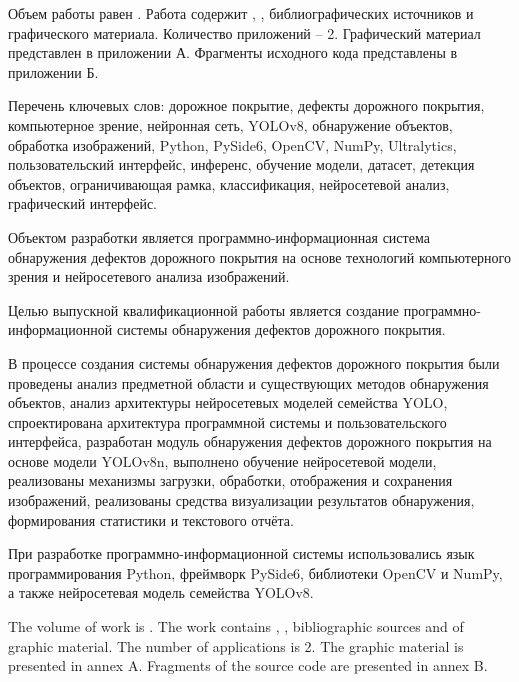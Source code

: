 
Объем работы равен . Работа содержит , ,  библиографических источников и  графического материала. Количество приложений – 2. Графический материал представлен в приложении А. Фрагменты исходного кода представлены в приложении Б.

Перечень ключевых слов: дорожное покрытие, дефекты дорожного покрытия, компьютерное зрение, нейронная сеть, YOLOv8, обнаружение объектов, обработка изображений, Python, PySide6, OpenCV, NumPy, Ultralytics, пользовательский интерфейс, инференс, обучение модели, датасет, детекция объектов, ограничивающая рамка, классификация, нейросетевой анализ, графический интерфейс.

Объектом разработки является программно-информационная система обнаружения дефектов дорожного покрытия на основе технологий компьютерного зрения и нейросетевого анализа изображений.

Целью выпускной квалификационной работы является создание программно-информационной системы обнаружения дефектов дорожного покрытия.

В процессе создания системы обнаружения дефектов дорожного покрытия были проведены анализ предметной области и существующих методов обнаружения объектов, анализ архитектуры нейросетевых моделей семейства YOLO, спроектирована архитектура программной системы и пользовательского интерфейса, разработан модуль обнаружения дефектов дорожного покрытия на основе модели YOLOv8n, выполнено обучение нейросетевой модели, реализованы механизмы загрузки, обработки, отображения и сохранения изображений, реализованы средства визуализации результатов обнаружения, формирования статистики и текстового отчёта.

При разработке программно-информационной системы использовались язык программирования Python, фреймворк PySide6, библиотеки OpenCV и NumPy, а также нейросетевая модель семейства YOLOv8.

  
The volume of work is . The work contains , ,  bibliographic sources and  of graphic material. The number of applications is 2. The graphic material is presented in annex A. Fragments of the source code are presented in annex B.

